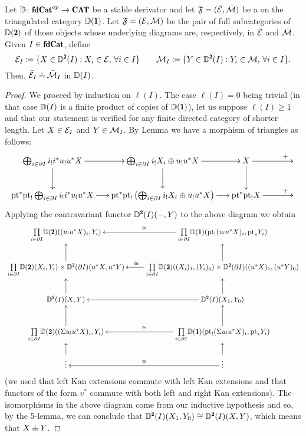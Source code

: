 \begin{lemma}\label{lifting_orthogonality}
Let $\D\colon \fincat^{op}\to \CAT$ be a stable derivator and let $\bar{\mathfrak{F}}=(\bar{\mathcal{E}},\bar{\mathcal{M}})$ be a \phfs on the triangulated category $\D(\uno)$.  Let $\mathfrak{F}=(\mathcal{E},\mathcal{M})$ be the pair of full subcategories of $\D(\due)$ of those objects whose underlying diagrams are, respectively, in $\bar {\mathcal{E}}$ and $\bar {\mathcal{M}}$. 
Given $I\in \fincat$, define
\[
\E_I \coloneqq \{X\in \D^{\due}(I):X_i\in \E, \, \forall i\in I\} \qquad \M_I \coloneqq \{Y\in \D^{\due}(I):Y_i\in \M, \, \forall i\in I\}.
\] 
Then, $\bar\E_I\horth\bar\M_I$ in $\mathbb{D}(I)$.
\end{lemma}
\begin{proof}
We proceed by induction on $\ell(I)$. The case $\ell(I)=0$ being trivial (in that case $\mathbb{D}(I)$ is a finite product of copies of $\D(\uno)$), let us suppose $\ell (I)\geq 1$ and that our statement is verified for any finite directed category of shorter length. 
Let $X\in \mathcal{E}_I$ and $Y\in \mathcal{M}_I$. 
By Lemma  we have a morphism of triangles as follows:
\[
\xymatrix@C=15pt{
\bigoplus_{i\in\partial I}i_!i^*u_!u^*X\ar[r]\ar[d]& \bigoplus_{i\in\partial I}i_!X_i\oplus u_!u^*X\ar[r]\ar[d]& X\ar[rr]^(.8)+\ar[d]&&\\
\pt^*\pt_!\bigoplus_{i\in\partial I}i_!i^*u_!u^*X\ar[r]& \pt^*\pt_!\left(\bigoplus_{i\in\partial I}i_!X_i\oplus u_!u^*X\right)\ar[r]& \pt^*\pt_!X\ar[rr]^(.8)+&&
}
\]
Applying the contravariant functor $\D^{\due}(I)(-,Y)$ to the above diagram we obtain
{\footnotesize \[
\xymatrix{
\underset{i\in\partial I}\prod \D(\due)((u_!u^*X)_i, Y_i) & \underset{i\in\partial I}\prod\D(\uno)(\pt_!(u_!u^*X)_i, \pt_*Y_i)\ar[l]_\cong\\
\ar[u]\underset{i\in\partial I}\prod\D(\due)(X_i, Y_i)\times \D^\due(\partial I)(u^*X, u^*Y) & \underset{i\in\partial I}\prod\D(\due)((X_i)_1, (Y_i)_0)\times \D^\due(\partial I)((u^*X)_1, (u^*Y)_0)\ar[u]\ar[l]_(.55)\cong\\
\ar[u]\D^\due(I)(X,Y) & \D^\due(I)(X_1, Y_0)\ar[u]\ar[l]\\
\ar[u]\underset{i\in\partial I}\prod\D(\due)((\Sigma u_!u^*X)_i, Y_i) & \underset{i\in\partial I}\prod\D(\uno)(\pt_!(\Sigma u_!u^*X)_i, \pt_* Y_i)\ar[u]\ar[l]_\cong\\
\vdots \ar[u]\ar@{<-}[r]^{\cong}& \vdots\ar[u] 
}
\]}\noindent
(we used that left Kan extensions commute with left Kan extensions and that functors of the form $v^*$ commute with both left and right Kan extensions). The isomorphisms in the above diagram come from our inductive hypothesis and so, by the 5-lemma, we can conclude that $\D^{\due}(I)(X_1,Y_0)\cong \D^{\due}(I)(X,Y)$, which means that $X\corth Y$.
\end{proof}

